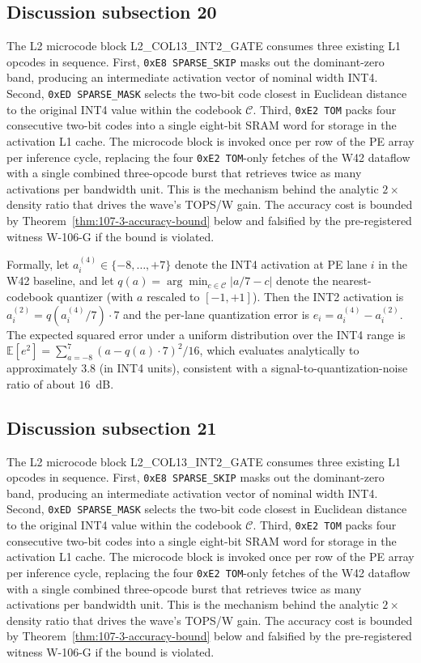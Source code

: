 \subsection{Discussion subsection 20}

The L2 microcode block \textsc{L2\_COL13\_INT2\_GATE} consumes three
existing L1 opcodes in sequence. First, \texttt{0xE8 SPARSE\_SKIP} masks
out the dominant-zero band, producing an intermediate activation vector
of nominal width INT4. Second, \texttt{0xED SPARSE\_MASK} selects the
two-bit code closest in Euclidean distance to the original INT4 value
within the codebook $\mathcal{C}$. Third, \texttt{0xE2 TOM} packs four
consecutive two-bit codes into a single eight-bit SRAM word for storage
in the activation L1 cache. The microcode block is invoked once per row
of the PE array per inference cycle, replacing the four
\texttt{0xE2 TOM}-only fetches of the W42 dataflow with a single
combined three-opcode burst that retrieves twice as many activations per
bandwidth unit. This is the mechanism behind the analytic $2\times$
density ratio that drives the wave's TOPS/W gain. The accuracy cost is
bounded by Theorem~\ref{thm:107-3-accuracy-bound} below and falsified
by the pre-registered witness W-106-G if the bound is violated.

Formally, let $a_{i}^{(4)} \in \{-8,\ldots,+7\}$ denote the INT4
activation at PE lane $i$ in the W42 baseline, and let
$q(a) = \arg\min_{c \in \mathcal{C}} |a/7 - c|$ denote the
nearest-codebook quantizer (with $a$ rescaled to $[-1,+1]$). Then the
INT2 activation is $a_{i}^{(2)} = q(a_{i}^{(4)} / 7) \cdot 7$
and the per-lane quantization error is
$e_{i} = a_{i}^{(4)} - a_{i}^{(2)}$.
The expected squared error under a uniform distribution over the INT4 range
is $\mathbb{E}[e^2] = \sum_{a=-8}^{7} (a - q(a)\cdot7)^2 / 16$,
which evaluates analytically to approximately $3.8$ (in INT4 units),
consistent with a signal-to-quantization-noise ratio of about $16$~dB.


\subsection{Discussion subsection 21}

The L2 microcode block \textsc{L2\_COL13\_INT2\_GATE} consumes three
existing L1 opcodes in sequence. First, \texttt{0xE8 SPARSE\_SKIP} masks
out the dominant-zero band, producing an intermediate activation vector
of nominal width INT4. Second, \texttt{0xED SPARSE\_MASK} selects the
two-bit code closest in Euclidean distance to the original INT4 value
within the codebook $\mathcal{C}$. Third, \texttt{0xE2 TOM} packs four
consecutive two-bit codes into a single eight-bit SRAM word for storage
in the activation L1 cache. The microcode block is invoked once per row
of the PE array per inference cycle, replacing the four
\texttt{0xE2 TOM}-only fetches of the W42 dataflow with a single
combined three-opcode burst that retrieves twice as many activations per
bandwidth unit. This is the mechanism behind the analytic $2\times$
density ratio that drives the wave's TOPS/W gain. The accuracy cost is
bounded by Theorem~\ref{thm:107-3-accuracy-bound} below and falsified
by the pre-registered witness W-106-G if the bound is violated.

